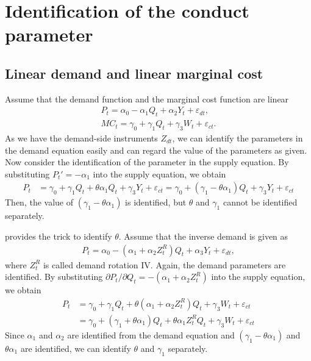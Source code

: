 \documentclass[11pt, a4paper]{article}
\begin{document}
\section{Identification of the conduct parameter}
\subsection{Linear demand and linear marginal cost}
Assume that the demand function and the marginal cost function are linear
\begin{align}
    P_{t}=\alpha_0 - \alpha_1 Q_{t} + \alpha_2 Y_t + \varepsilon_{dt},\\
    MC_{t} = \gamma_0 + \gamma_1 Q_t + \gamma_3 W_t + \varepsilon_{ct}.
\end{align}
As we have the demand-side instruments $Z_{dt}$, we can identify the parameters in the demand equation easily and can regard the value of the parameters as given.
Now consider the identification of the parameter in the supply equation.
By substituting $P_t'= - \alpha_1$ into the supply equation, we obtain
\begin{align}
    P_{t}&=\gamma_0+\gamma_1 Q_t + \theta\alpha_1 Q_t + \gamma_3 Y_t + \varepsilon_{ct} =\gamma_0+\left(\gamma_1- \theta\alpha_1\right) Q_t + \gamma_3 Y_t + \varepsilon_{ct} 
\end{align}
Then, the value of $(\gamma_1- \theta\alpha_1)$ is identified, but $\theta$ and $\gamma_1$ cannot be identified separately.

\cite{bresnahan1982oligopoly} provides the trick to identify $\theta$. 
Assume that the inverse demand is given as 
\begin{align}
    P_{t}=\alpha_0 - (\alpha_1+\alpha_2 Z^R_t) Q_{t} + \alpha_3 Y_t + \varepsilon_{dt},
\end{align}
where $Z^R_t$ is called demand rotation IV.
Again, the demand parameters are identified.
By substituting $\partial P_t/\partial Q_t = -(\alpha_1+\alpha_2 Z^R_t)$ into the supply equation, we obtain
\begin{align}
    P_{t}&=\gamma_0+\gamma_1 Q_t + \theta (\alpha_1+\alpha_2 Z^R_t) Q_t + \gamma_3 W_t + \varepsilon_{ct} \\
    &= \gamma_0 + (\gamma_1 + \theta \alpha_1) Q_t + \theta\alpha_1 Z^R_tQ_t + \gamma_3 W_t + \varepsilon_{ct}  
\end{align}
Since $\alpha_1$ and $\alpha_2$ are identified from the demand equation and $(\gamma_1 - \theta\alpha_1)$ and $\theta \alpha_1$ are identified, we can identify $\theta$ and $\gamma_1$ separately.
\end{document}
